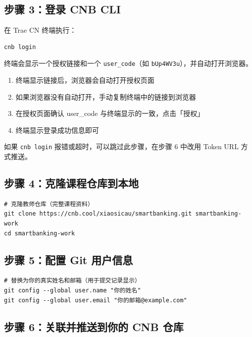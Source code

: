 \subsection{步骤 3：登录 CNB CLI}

在 Trae CN 终端执行：

\begin{lstlisting}[style=shell]
cnb login
\end{lstlisting}

终端会显示一个授权链接和一个 \texttt{user\_code}（如 \texttt{bUp4WV3u}），并自动打开浏览器。

\begin{enumerate}[leftmargin=2em]
  \item 终端显示链接后，浏览器会自动打开授权页面
  \item 如果浏览器没有自动打开，手动复制终端中的链接到浏览器
  \item 在授权页面确认 user\_code 与终端显示的一致，点击「授权」
  \item 终端显示登录成功信息即可
\end{enumerate}

如果 \texttt{cnb login} 报错或超时，可以跳过此步骤，在步骤 6 中改用 Token URL 方式推送。

\subsection{步骤 4：克隆课程仓库到本地}

\begin{lstlisting}[style=shell]
# 克隆教师仓库（完整课程资料）
git clone https://cnb.cool/xiaosicau/smartbanking.git smartbanking-work
cd smartbanking-work
\end{lstlisting}

\subsection{步骤 5：配置 Git 用户信息}

\begin{lstlisting}[style=shell]
# 替换为你的真实姓名和邮箱（用于提交记录显示）
git config --global user.name "你的姓名"
git config --global user.email "你的邮箱@example.com"
\end{lstlisting}

\subsection{步骤 6：关联并推送到你的 CNB 仓库}

